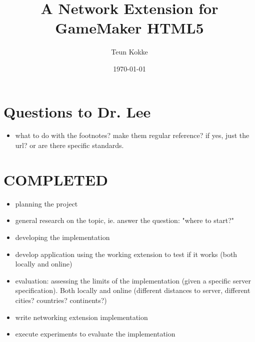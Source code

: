 \documentclass[bsc,frontabs,twoside,singlespacing,parskip,deptreport]{infthesis}     %
\begin{document}
\title{A Network Extension for GameMaker HTML5}

\author{Teun Kokke}

\date{\today}


\maketitle

\section*{Questions to Dr. Lee}
\begin{itemize}
\item what to do with the footnotes? make them regular reference? if yes, just the url? or are there specific standards.
\end{itemize}

\section*{COMPLETED}
\begin{itemize}
\item planning the project
\item general research on the topic, ie. answer the question: "where to start?"
\item developing the implementation
\item develop application using the working extension to test if it works (both locally and online)
\item evaluation: assessing the limits of the implementation (given a specific server specification).  Both locally and online (different distances to server, different cities? countries? continents?)
\item write networking extension implementation
\item execute experiments to evaluate the implementation
\end{itemize}
\end{document}
